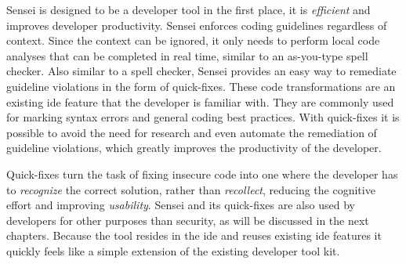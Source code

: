Sensei is designed to be a developer tool in the first place, it is \textit{efficient} and improves developer productivity.
Sensei enforces coding guidelines regardless of context.
Since the context can be ignored, it only needs to perform local code analyses that can be completed in real time, similar to an as-you-type spell checker.
Also similar to a spell checker, Sensei provides an easy way to remediate guideline violations in the form of quick-fixes. 
These code transformations are an existing \gls{ide} feature that the developer is familiar with.
They are commonly used for marking syntax errors and general coding best practices.
With quick-fixes it is possible to avoid the need for research and even automate the remediation of guideline violations, which greatly improves the productivity of the developer.

Quick-fixes turn the task of fixing insecure code into one where the developer has to \textit{recognize} the correct solution, rather than \textit{recollect}, reducing the cognitive effort and improving \textit{usability}.
Sensei and its quick-fixes are also used by developers for other purposes than security, as will be discussed in the next chapters.
Because the tool resides in the \gls{ide} and reuses existing \gls{ide} features it quickly feels like a simple extension of the existing developer tool kit.